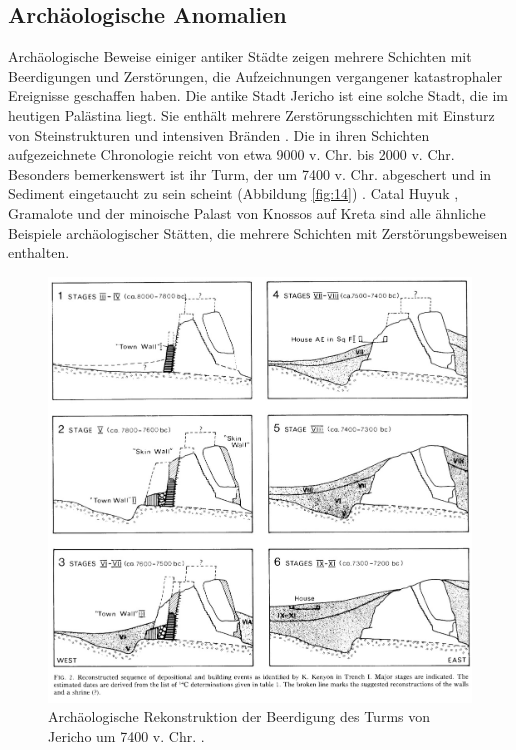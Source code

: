 \documentclass[10pt,twocolumn,letterpaper]{article}
\begin{document}
\subsection{Archäologische Anomalien}

Archäologische Beweise einiger antiker Städte zeigen mehrere Schichten mit Beerdigungen und Zerstörungen, die Aufzeichnungen vergangener katastrophaler Ereignisse geschaffen haben. Die antike Stadt Jericho ist eine solche Stadt, die im heutigen Palästina liegt. Sie enthält mehrere Zerstörungsschichten mit Einsturz von Steinstrukturen und intensiven Bränden \cite{96,97}. Die in ihren Schichten aufgezeichnete Chronologie reicht von etwa 9000 v. Chr. bis 2000 v. Chr. Besonders bemerkenswert ist ihr Turm, der um 7400 v. Chr. abgeschert und in Sediment eingetaucht zu sein scheint (Abbildung \ref{fig:14}) \cite{95}. Catal Huyuk \cite{99}, Gramalote \cite{98} und der minoische Palast von Knossos auf Kreta \cite{100,101} sind alle ähnliche Beispiele archäologischer Stätten, die mehrere Schichten mit Zerstörungsbeweisen enthalten.

\begin{figure}[t]
\begin{center}
   \includegraphics[width=1\linewidth]{jericho.jpg}
\end{center}
   \caption{Archäologische Rekonstruktion der Beerdigung des Turms von Jericho um 7400 v. Chr. \cite{95}.}
\label{fig:14}
\label{fig:onecol}
\end{figure}
\end{document}
